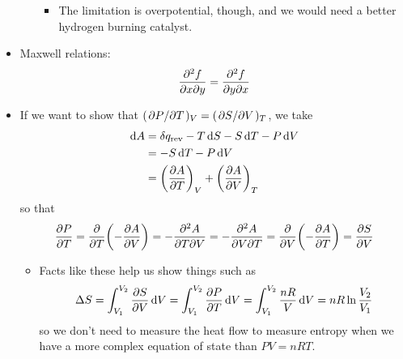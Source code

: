 \documentclass[../notes.tex]{subfiles}
\begin{document}
\begin{itemize}
\begin{itemize}
        \begin{itemize}
            \item The limitation is overpotential, though, and we would need a better hydrogen burning catalyst.
        \end{itemize}
    \end{itemize}
    \item Maxwell relations:
    \begin{equation*}
        \pdv{f}{x}{y} = \pdv{f}{y}{x}
    \end{equation*}
    \item If we want to show that $(\pdv*{P}{T})_V=(\pdv*{S}{V})_T$, we take
    \begin{align*}
        \dd{A} &= \var{q_\text{rev}}-T\dd{S}-S\dd{T}-P\dd{V}\\
        &= -S\dd{T}-P\dd{V}\\
        &= \left( \pdv{A}{T} \right)_V+\left( \pdv{A}{V} \right)_T
    \end{align*}
    so that
    \begin{equation*}
        \pdv{P}{T} = \pdv{T}(-\pdv{A}{V})
        = -\pdv{A}{T}{V}
        = -\pdv{A}{V}{T}
        = \pdv{V}(-\pdv{A}{T})
        = \pdv{S}{V}
    \end{equation*}
    \begin{itemize}
        \item Facts like these help us show things such as
        \begin{equation*}
            \Delta S = \int_{V_1}^{V_2}\pdv{S}{V}\dd{V}
            = \int_{V_1}^{V_2}\pdv{P}{T}\dd{V}
            = \int_{V_1}^{V_2}\frac{nR}{V}\dd{V}
            = nR\ln\frac{V_2}{V_1}
        \end{equation*}
        so we don't need to measure the heat flow to measure entropy when we have a more complex equation of state than $PV=nRT$.
    \end{itemize}
\end{itemize}
\end{document}
